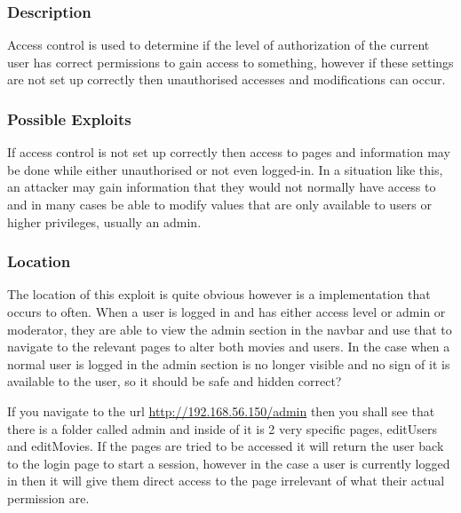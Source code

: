 \documentclass[titlepage]{article}
\begin{document}
      \subsubsection{Description} %
      \label{ssub:broken_access_controls_description}
   
      Access control is used to determine if the level of authorization of the current user has correct permissions to gain access to something, however if these settings are not set up correctly then unauthorised accesses and modifications can occur.


      \subsubsection{Possible Exploits} %
      \label{ssub:broken_access_controls_possible_exploits}
      
      If access control is not set up correctly then access to pages and information may be done while either unauthorised or not even logged-in. In a situation like this, an attacker may gain information that they would not normally have access to and in many cases be able to modify values that are only available to users or higher privileges, usually an admin.


      \subsubsection{Location} %
      \label{ssub:broken_access_controls_location}
      
      The location of this exploit is quite obvious however is a implementation that occurs to often. When a user is logged in and has either access level or admin or moderator, they are able to view the admin section in the navbar and use that to navigate to the relevant pages to alter both movies and users. In the case when a normal user is logged in the admin section is no longer visible and no sign of it is available to the user, so it should be safe and hidden correct?

      If you navigate to the url \url{http://192.168.56.150/admin} then you shall see that there is a folder called admin and inside of it is 2 very specific pages, editUsers and editMovies. If the pages are tried to be accessed it will return the user back to the login page to start a session, however in the case a user is currently logged in then it will give them direct access to the page irrelevant of what their actual permission are.
\end{document}

